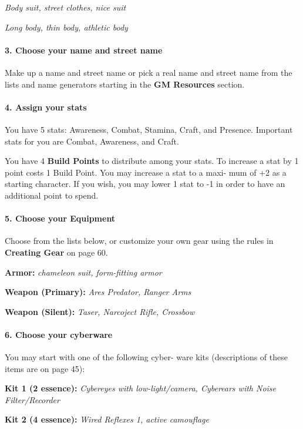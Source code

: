\begin{multicols}{3}
\textit{Body suit, street clothes, nice suit}

\textit{Long body, thin body, athletic body}

\paragraph{3.  Choose your name and street name}

Make up a name and street name or pick a real
name and street name from the lists and name
generators starting in the \textbf{GM Resources} section.

\paragraph{4.  Assign your stats}

You have 5 stats: Awareness, Combat, Stamina,
Craft, and Presence. Important stats for you are
Combat, Awareness, and Craft.


You have 4 \textbf{Build Points} to distribute among
your stats. To increase a stat by 1 point costs 1
Build Point. You may increase a stat to a maxi-
mum of +2 as a starting character. If you wish,
you may lower 1 stat to -1 in order to have an
additional point to spend.

\paragraph{5.  Choose your Equipment}

Choose from the lists below, or customize your
own gear using the rules in \textbf{Creating Gear} on
page 60.

\textbf{Armor:} \textit{chameleon suit, form-fitting armor}

\textbf{Weapon (Primary):} \textit{Ares Predator,
   Ranger Arms}

\textbf{Weapon (Silent):} \textit{Taser, Narcoject
Rifle, Crossbow}


\paragraph{6.  Choose your cyberware}

You may start with one of the following cyber-
ware kits (descriptions of these items are on
page 45):

\textbf{Kit 1 (2 essence):} \textit{Cybereyes with
  low-light/camera, Cyberears with Noise Filter/Recorder}

\textbf{Kit 2 (4 essence):} \textit{Wired Reflexes
  1, active camouflage}



\end{multicols}
